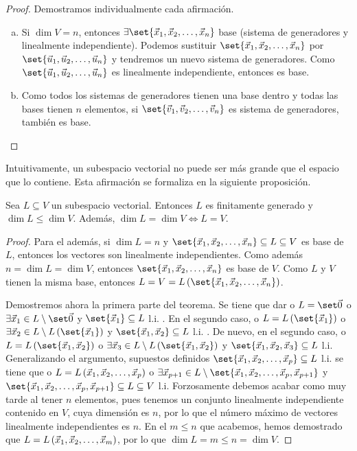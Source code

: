 \documentclass[../algebra_lineal.tex]{subfiles}
\begin{document}
\begin{proof}
    Demostramos individualmente cada afirmación.
    \begin{enumerate}[a)]
        \item Si $\dim{V} = n$, entonces $\exists \set{\vlst{x}{n}}$ base (sistema de generadores y linealmente independiente). Podemos sustituir $\set{\vlst{x}{n}}$ por $\set{\vlst{u}{n}}$ y tendremos un nuevo sistema de generadores. Como $\set{\vlst{u}{n}}$ es linealmente independiente, entonces es base.
        \item Como todos los sistemas de generadores tienen una base dentro y todas las bases tienen $n$ elementos, si $\set{\vlst{v}{n}}$ es sistema de generadores, también es base.
    \end{enumerate}
\end{proof}

Intuitivamente, un subespacio vectorial no puede ser más grande que el espacio que lo contiene. Esta afirmación se formaliza en la siguiente proposición.

\begin{proposition}
    Sea $L \subseteq V$ un subespacio vectorial. Entonces $L$ es finitamente generado y $\dim{L} \le \dim{V}$. Además, $\dim{L}=\dim{V} \iff L = V$.
\end{proposition}

\begin{proof}
    Para el además, si $\dim{L} = n$ y $\set{\vlst{x}{n}} \subseteq L \subseteq V$ es base de $L$, entonces los vectores son linealmente independientes. Como además $n = \dim{L} = \dim{V}$, entonces $\set{\vlst{x}{n}}$ es base de $V$. Como $L$ y $V$ tienen la misma base, entonces $L=V=\lspan{\set{\vlst{x}{n}}}$.

    Demostremos ahora la primera parte del teorema.  Se tiene que dar o $L = \zvs$ o $\exists \vx_1 \in L \setminus \zvs$ y $\set{\vx_1} \subseteq L$ l.i. . En el segundo caso, o $L=\lspan{\set{\vx_1}}$ o $\exists \vx_2 \in L \setminus \lspan{\set{\vx_1}}$ y $\set{\vx_1, \vx_2} \subseteq L$ l.i. . De nuevo, en el segundo caso, o $L=\lspan{\set{\vx_1, \vx_2}}$ o $\exists \vx_3 \in L \setminus \lspan{\set{\vx_1, \vx_2}}$ y $\set{\vx_1, \vx_2, \vx_3} \subseteq L$ l.i. Generalizando el argumento, supuestos definidos $\set{\vlst{x}{p}} \subseteq L$ l.i. se tiene que o $L = L\left({\vec{x}}_{1}, {\vec{x}}_{2}, \dots, {\vec{x}}_{p}\right)$ o $\exists \vx_{p+1} \in L \setminus \set{\vlst{x}{p}, \vx_{p+1}}$ y $\set{\vlst{x}{p}, \vx_{p+1}} \subseteq L \subseteq V$ l.i. Forzosamente debemos acabar como muy tarde al tener $n$ elementos, pues tenemos un conjunto linealmente independiente contenido en $V$, cuya dimensión es $n$, por lo que el número máximo de vectores linealmente independientes es $n$. En el $m \le n$ que acabemos, hemos demostrado que $L = L\left({\vec{x}}_{1}, {\vec{x}}_{2}, \dots, {\vec{x}}_{m}\right)$, por lo que $\dim{L} = m \le n = \dim{V}$.
\end{proof}
\end{document}
